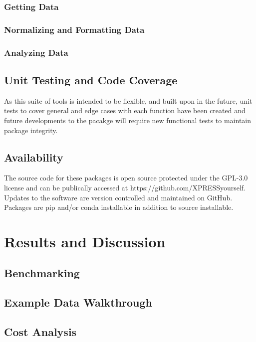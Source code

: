 \documentclass[11pt, a4paper, oneside]{article}
\begin{document}
\subsubsection{Getting Data}

\subsubsection{Normalizing and Formatting Data}

\subsubsection{Analyzing Data}

\subsection{Unit Testing and Code Coverage}
As this suite of tools is intended to be flexible, and built upon in the future, unit tests to cover general and edge cases with each function have been created and future developments to the pacakge will require new functional tests to maintain package integrity.

\subsection{Availability}
The source code for these packages is open source protected under the GPL-3.0 license and can be publically accessed at https://github.com/XPRESSyourself. Updates to the software are version controlled and maintained on GitHub. Packages are pip and/or conda installable in addition to source installable. 

\section*{Results and Discussion}

\subsection{Benchmarking}

\subsection{Example Data Walkthrough}

\subsection{Cost Analysis}
\end{document}

